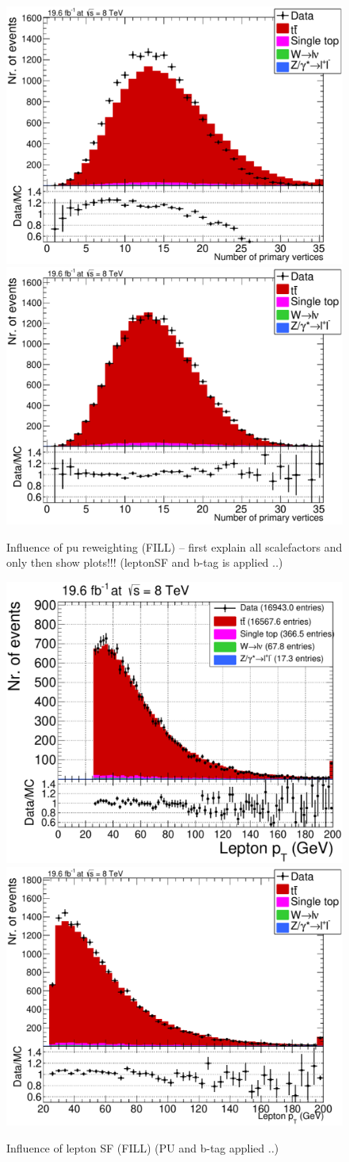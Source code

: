 \begin{figure}[h!t]
 \centering
 \includegraphics[width = 0.45 \textwidth]{Chapters/Chapter4_EvtSel/Figures/nPV_AllCuts_noPU_mu_Stack.pdf}
 \includegraphics[width = 0.45 \textwidth]{Chapters/Chapter4_EvtSel/Figures/nPV_AllCuts_mu_Stack.pdf}
 \caption{Influence of pu reweighting (FILL) -- first explain all scalefactors and only then show plots!!! (leptonSF and b-tag is applied ..)} \label{fig::PUInfl}
\end{figure}

\begin{figure}[h!t]
 \centering
 \includegraphics[width = 0.45 \textwidth]{Chapters/Chapter4_EvtSel/Figures/LeptonPt_AllCuts_noMuSF_mu_Stack.pdf}
 \includegraphics[width = 0.45 \textwidth]{Chapters/Chapter4_EvtSel/Figures/LeptonPt_AllCuts_mu_Stack.pdf}
 \caption{Influence of lepton SF (FILL) (PU and b-tag applied ..)} \label{fig::LeptonSFInfl}
\end{figure}

